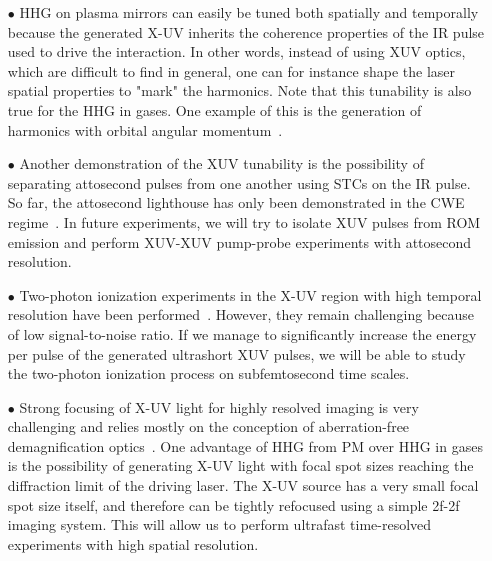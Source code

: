 \begin{itemize}
\item[$\bullet$]  HHG on plasma mirrors can easily be tuned both spatially and temporally~\cite{Borot2012} because the  generated X-UV inherits the coherence properties of the IR pulse used to drive the interaction. In other words, instead of using XUV optics, which are difficult to find in general, one can for instance shape the laser spatial properties to "mark" the harmonics.  Note that this tunability is also true for the HHG in gases. One example of this is the generation of harmonics with orbital angular momentum~\cite{geneaux2015attosecond}.

\item[$\bullet$]  Another demonstration of the XUV tunability is the possibility of separating attosecond pulses from one another using STCs on the IR pulse. So far, the attosecond lighthouse has only been demonstrated in the CWE regime~\cite{Wheeler2012}. In future experiments, we will try to isolate XUV pulses from ROM emission and perform XUV-XUV pump-probe experiments with attosecond resolution.

\item[$\bullet$]  Two-photon ionization experiments in the X-UV region with high temporal resolution have been performed~\cite{miyamoto2004observation,guan2008dynamics,papadogiannis2003two}. However, they remain challenging because of low signal-to-noise ratio. If we manage to significantly increase the energy per pulse of the generated ultrashort XUV pulses, we will be able to study the two-photon ionization process on subfemtosecond time scales.

\item[$\bullet$]  Strong focusing of X-UV light for highly resolved imaging is very challenging and relies mostly on the conception of aberration-free demagnification optics~\cite{poletto2013micro,valentin2003imaging}. One advantage of HHG from PM over HHG in gases is the possibility of generating X-UV light with focal spot sizes reaching the diffraction limit of the driving laser. The X-UV source has a very small focal spot size itself, and therefore can be tightly refocused using a simple 2f-2f imaging system. This will allow us to perform ultrafast time-resolved experiments with high spatial resolution. 
\end{itemize}

\vspace{0.2in}

